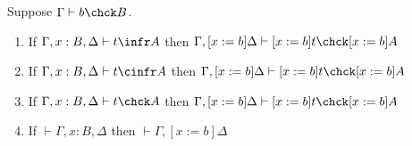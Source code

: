 \begin{lemma}
    Suppose $\Gamma \vdash b \chck B$.
    \begin{enumerate}
        \item If $\Gamma, x : B, \Delta \vdash t \infr A$ then $\Gamma, [x := b]\Delta \vdash [x := b]t \chck [x := b]A$
        \item If $\Gamma, x : B, \Delta \vdash t \cinfr A$ then $\Gamma, [x := b]\Delta \vdash [x := b]t \chck [x := b]A$
        \item If $\Gamma, x : B, \Delta \vdash t \chck A$ then $\Gamma, [x := b]\Delta \vdash [x := b]t \chck [x := b]A$
        \item If $\vdash \Gamma, x : B, \Delta$ then $\vdash \Gamma, [x := b]\Delta$
    \end{enumerate}
    \label{lem:2:subst_check}
\end{lemma}
